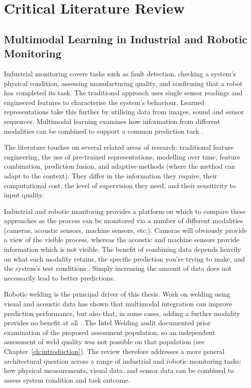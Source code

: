 \chapter{Critical Literature Review}

\label{ch:literature}

\section*{Multimodal Learning in Industrial and Robotic Monitoring}


Industrial monitoring covers tasks such as fault detection, checking a system's physical condition,
assessing manufacturing quality, and confirming that a robot has completed its task. The traditional
approach uses single sensor readings and engineered features to characterise the system's behaviour.
Learned representations take this further by utilising data from images, sound and sensor sequences.
Multimodal learning examines how information from different modalities can be combined to support a
common prediction task \parencite{Baltrusaitis2019Multimodal,Huo2022Multisensor,Thoduka2024Handover}.

The literature touches on several related areas of research: traditional feature engineering, the
use of pre-trained representations, modelling over time, feature combination, prediction fusion, and
adaptive methods (where the method can adapt to the context). They differ in the information they
require, their computational cost, the level of supervision they need, and their sensitivity to
input quality.

Industrial and robotic monitoring provides a platform on which to compare these approaches as the
process can be monitored via a number of different modalities (cameras, acoustic sensors, machine
sensors, etc.). Cameras will obviously provide a view of the visible process, whereas the acoustic
and machine sensors provide information which is not visible. The benefit of combining data depends
heavily on what each modality retains, the specific prediction you're trying to make, and the
system's test conditions \parencite{Wang2020What,Hua2026Weld,Goodarzi2023Deep}. Simply increasing the
amount of data does not necessarily lead to better predictions.

Robotic welding is the principal driver of this thesis. Work on welding using visual and acoustic
data has shown that multimodal integration can improve prediction performance, but also that, in
some cases, adding a further modality provides no benefit at all \parencite{P003,Hua2026Weld}. The Intel
Welding audit documented prior examination of the proposed assessment population, so an independent
assessment of weld quality was not possible on that population (see Chapter~\ref{ch:introduction}).
The review therefore addresses a more general architectural question across a range of industrial
and robotic monitoring tasks: how physical measurements, visual data, and sensor data can be
combined to assess system condition and task outcome.

